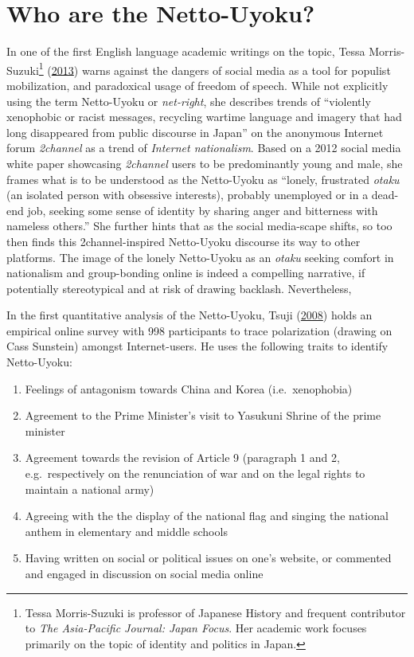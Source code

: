 \documentclass[10pt,british,A4paper,,openany]{memoir}
\providecommand{\tightlist}{%
  \setlength{\itemsep}{0pt}\setlength{\parskip}{0pt}}
\begin{document}
\section{Who are the Netto-Uyoku?}\label{who-are-the-netto-uyoku}

In one of the first English language academic writings on the topic,
Tessa Morris-Suzuki\footnote{Tessa Morris-Suzuki is professor of
  Japanese History and frequent contributor to \emph{The Asia-Pacific
  Journal: Japan Focus}. Her academic work focuses primarily on the
  topic of identity and politics in Japan.}
(\protect\hyperlink{ref-morris-suzuki_freedom_2013}{2013}) warns against
the dangers of social media as a tool for populist mobilization, and
paradoxical usage of freedom of speech. While not explicitly using the
term Netto-Uyoku or \emph{net-right}, she describes trends of
``violently xenophobic or racist messages, recycling wartime language
and imagery that had long disappeared from public discourse in Japan''
on the anonymous Internet forum \emph{2channel} as a trend of
\emph{Internet nationalism}. Based on a 2012 social media white paper
showcasing \emph{2channel} users to be predominantly young and male, she
frames what is to be understood as the Netto-Uyoku as ``lonely,
frustrated \emph{otaku} (an isolated person with obsessive interests),
probably unemployed or in a dead-end job, seeking some sense of identity
by sharing anger and bitterness with nameless others.'' She further
hints that as the social media-scape shifts, so too then finds this
2channel-inspired Netto-Uyoku discourse its way to other platforms. The
image of the lonely Netto-Uyoku as an \emph{otaku} seeking comfort in
nationalism and group-bonding online is indeed a compelling narrative,
if potentially stereotypical and at risk of drawing backlash.
Nevertheless,

In the first quantitative analysis of the Netto-Uyoku, Tsuji
(\protect\hyperlink{ref-tsuji_eng:_2008}{2008}) holds an empirical
online survey with 998 participants to trace polarization (drawing on
Cass Sunstein) amongst Internet-users. He uses the following traits to
identify Netto-Uyoku:

\begin{enumerate}
\def\labelenumi{\arabic{enumi}.}
\tightlist
\item
  Feelings of antagonism towards China and Korea (i.e.~xenophobia)
\item
  Agreement to the Prime Minister's visit to Yasukuni Shrine of the
  prime minister
\item
  Agreement towards the revision of Article 9 (paragraph 1 and 2,
  e.g.~respectively on the renunciation of war and on the legal rights
  to maintain a national army)
\item
  Agreeing with the the display of the national flag and singing the
  national anthem in elementary and middle schools
\item
  Having written on social or political issues on one's website, or
  commented and engaged in discussion on social media online
\end{enumerate}
\end{document}
